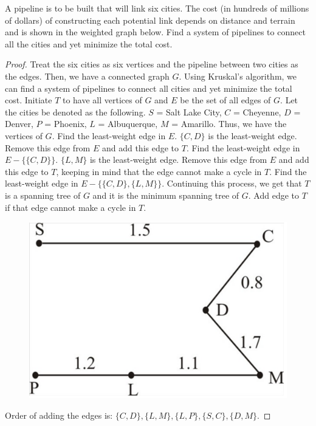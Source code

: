 \documentclass[14pt]{extarticle}
\begin{document}
A pipeline is to be built that will link six cities. The cost (in hundreds of millions of dollars) of constructing each potential link depends on distance and terrain and is shown in the weighted graph below. Find a system of pipelines to connect all the cities and yet minimize the total cost.

\begin{proof}
    Treat the six cities as six vertices and the pipeline between two cities as the edges. Then, we have a connected graph
    \(G\). Using Kruskal's algorithm, we can find a system of pipelines to connect all cities and yet minimize the total
    cost. Initiate \(T\) to have all vertices of \(G\) and \(E\) be the set of all edges of \(G\). Let the cities be denoted as
    the following. \(S\) = Salt Lake City, \(C\) = Cheyenne, \(D\) = Denver, \(P\) = Phoenix, \(L\) = Albuquerque, \(M\) =
    Amarillo. Thus, we have the vertices of \(G\). Find the least-weight edge in \(E\). \(\{C, D\}\) is the least-weight edge.
    Remove this edge from \(E\) and add this edge to \(T\). Find the least-weight edge in \(E - \{\{C, D\}\}\). \(\{L, M\}\) is
    the least-weight edge. Remove this edge from \(E\) and add this edge to \(T\), keeping in mind that the edge cannot make
    a cycle in \(T\). Find the least-weight edge in \(E - \{\{C, D\}, \{L, M\}\}\). Continuing this process, we get that \(T\)
    is a spanning tree of \(G\) and it is the minimum spanning tree of \(G\). Add edge to \(T\) if that edge cannot make a
    cycle in \(T\).

    \begin{figure}[ht!]
        \centering
        \includegraphics[scale=0.15]{../images/10.6.11.2.png}
    \end{figure}

    Order of adding the edges is: \(\{C, D\}, \{L, M\}, \{L, P\}, \{S, C\}, \{D, M\}\).
\end{proof}
\end{document}
